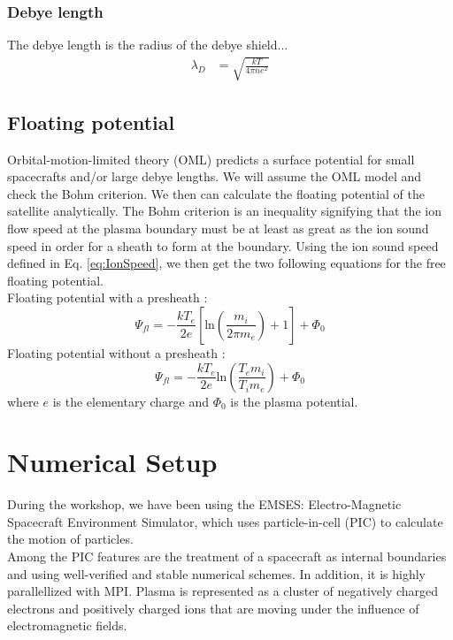 \documentclass[aip, 
rsi, 
amsmath,
amssymb,
longbibliography,
preprint]{revtex4-1}
\begin{document}
\subsubsection*{Debye length}
The debye length is the radius of the debye shield...
\begin{align}
\lambda_D &= \sqrt{\frac{k T}{4 \pi n e^2}}\label{eq:Debye}
\end{align}

\subsection{Floating potential}

Orbital-motion-limited theory (OML) predicts a surface potential for small spacecrafts and/or large debye lengths. We will assume the OML model and check the Bohm criterion. We then can calculate the floating potential of the satellite analytically. The Bohm criterion is an inequality signifying that the ion flow speed at the plasma boundary must be at least as great as the ion sound speed in order for a sheath to form at the boundary.  Using the ion sound speed defined in Eq. \ref{eq:IonSpeed}, we then get the two following equations for the free floating potential. \\

Floating potential with a presheath \cite{Boef}:
\begin{equation}\label{eq:Boef}
\Psi_{fl} = -\frac{k T_e}{2e}[\text{ln}(\frac{m_i}{2\pi m_e})+1]+\Phi_0
\end{equation}
Floating potential without a presheath \cite{Pesceli}:
\begin{equation}\label{eq:Pesceli}
\Psi_{fl}=-\frac{k T_e}{2e}\text{ln}(\frac{T_em_i}{T_i m_e})+\Phi_0
\end{equation}
where $e$ is the elementary charge and $\Phi_0$ is the plasma potential. \\

\section{\label{sec:numsetup} Numerical Setup}

During the workshop, we have been using the EMSES: Electro-Magnetic Spacecraft Environment Simulator, which uses particle-in-cell (PIC) to calculate the motion of particles.\\

Among the PIC features are the treatment of a spacecraft as internal boundaries and using well-verified and stable numerical schemes. In addition, it is highly parallellized with MPI. Plasma is represented as a cluster\cite{numsetup} of negatively charged electrons and positively charged ions that are moving under the influence of electromagnetic fields.\\
\end{document}
